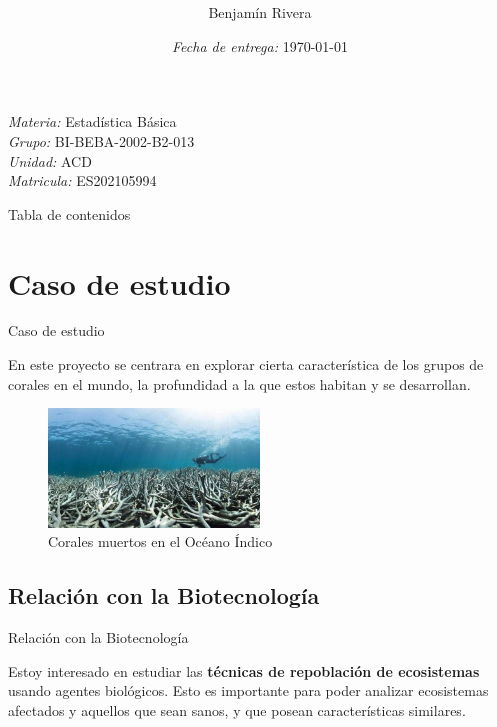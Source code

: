 \documentclass[11pt]{beamer}
\title[Actividad 1]{
	\bf{\titulo}}
\author{ Benjamín Rivera }
\institute{Universidad Abierta y a Distancia de México \\
	\tiny
	TSU en Biotecnolog\'ia }
\date{\textit{Fecha de entrega:} \today}
\newcommand{\materia}[0]{Estadística Básica}
\newcommand{\grupo}[0]{BI-BEBA-2002-B2-013}
\newcommand{\unidad}[0]{ACD}
\begin{document}
	\begin{frame}
		\maketitle\tiny
		\textit{Materia:} \materia \\
		\textit{Grupo:} \grupo \\
		\textit{Unidad:} \unidad \\
		\textit{Matricula:} ES202105994
		
	\end{frame}

	\begin{frame}{Tabla de contenidos}
		\tableofcontents
	\end{frame}

\section{Caso de estudio}
	
	\begin{frame}{Caso de estudio}		
		\par En este proyecto se centrara en explorar cierta característica de los grupos de corales en el mundo, la profundidad a la que estos habitan y se desarrollan.
		
		\begin{figure}[h]
			\centering
				\includegraphics[width=0.5\textwidth]{coral-muerto.jpg}
			\caption{Corales muertos en el Océano Índico \cite{corales muertos}}
			\label{fig: corales muertos}
		\end{figure}
	\end{frame}
	
	\subsection{Relación con la Biotecnología}
	\begin{frame}{Relación con la Biotecnología}
		\par Estoy interesado en estudiar las \textbf{técnicas de repoblación de ecosistemas} usando agentes biológicos. Esto es importante para poder analizar ecosistemas afectados y aquellos que sean sanos, y que posean características similares.
	\end{frame}
\end{document}
